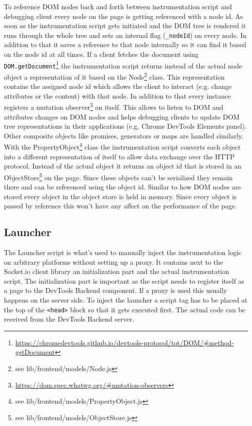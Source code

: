 To reference DOM nodes back and forth between instrumentation script and debugging client every node on
the page is getting referenced with a node id. As soon as the instrumentation script gets initiated and
the DOM tree is rendered it runs through the whole tree and sets an internal flag (\texttt{\_nodeId}) on
every node. In addition to that it saves a reference to that node internally so it can find it based
on the node id at all times. If a client fetches the document using \texttt{DOM.getDocument}\footnote{\url{https://chromedevtools.github.io/devtools-protocol/tot/DOM/\#method-getDocument}}
the instrumentation script returns instead of the actual node object a representation of it based on
the Node\footnote{see lib/frontend/models/Node.js} class. This representation contains the assigned node
id which allows the client to interact (e.g. change attributes or the content) with that node. In addition
to that every instance registers a mutation observer\footnote{\url{https://dom.spec.whatwg.org/\#mutation-observers}}
on itself. This allows to listen to DOM and attributes changes on DOM nodes and helps debugging clients
to update DOM tree representations in their applications (e.g. Chrome DevTools Elements panel). Other composite
objects like promises, generators or maps are handled similarly. With the PropertyObject\footnote{see lib/frontend/models/PropertyObject.js}
class the instrumentation script converts each object into a different representation of itself to allow
data exchange over the HTTP protocol. Instead of the actual object it returns an object id that is stored
in an ObjectStore\footnote{see lib/frontend/models/ObjectStore.js} on the page. Since these objects can't
be serialized they remain there and can be referenced using the object id. Similar to how DOM nodes are
stored every object in the object store is held in memory. Since every object is passed by reference this
won't have any affect on the performance of the page.

\subsection{Launcher\label{sec:launcher}}

The Launcher script is what's used to manually inject the instrumentation logic on arbitrary platforms
without setting up a proxy. It contains next to the Socket.io client library an initialization part and
the actual instrumentation script. The initialization part is important as the script needs to register
itself as a page to the DevTools Backend component. If a proxy is used this usually happens on the server
side. To inject the launcher a script tag has to be placed at the top of the \texttt{<head>} block so
that it gets executed first. The actual code can be received from the DevTools Backend server.

